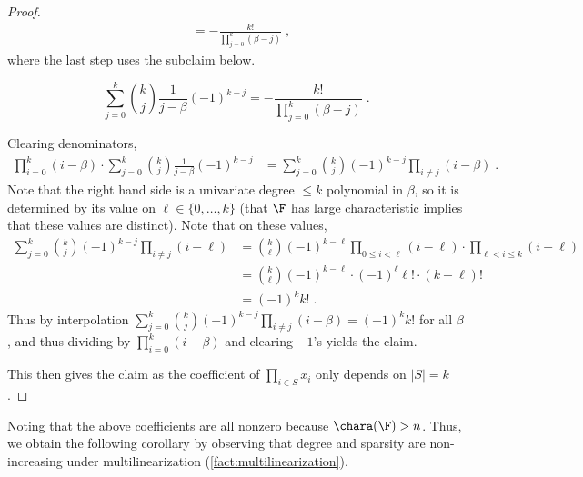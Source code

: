 \documentclass[11pt]{article}
\numberwithin{equation}{section}
\theoremstyle{definition}
\theoremstyle{plain}
\begin{document}
\begin{proof}
\begin{align*}
                &=-\frac{k!}{\prod_{j=0}^k (\beta-j)}
                \;,
        \end{align*}
        where the last step uses the %
            subclaim below.   %
        \begin{subclaim}
                \[
                        \sum_{j=0}^k \binom{k}{j} \frac{1}{j-\beta} (-1)^{k-j}
                        =-\frac{k!}{\prod_{j=0}^k (\beta-j)}
                        \;.
                \]
        \end{subclaim}
        \begin{subproof}
                Clearing denominators,
                \begin{align*}
                        \prod_{i=0}^k (i-\beta)\cdot \sum_{j=0}^k \binom{k}{j} \frac{1}{j-\beta} (-1)^{k-j}
                        &=\sum_{j=0}^k \binom{k}{j}(-1)^{k-j} \prod_{i\ne j} (i-\beta)
                        \;.
                \end{align*}
                Note that the right hand side is a univariate degree $\le k$ polynomial in $\beta$, so it is determined by its value on $\ell\in\{0,\ldots,k\}$ (that $\F$ has large characteristic implies that these values are distinct). Note that on these values,
                \begin{align*}
                        \sum_{j=0}^k \binom{k}{j}(-1)^{k-j} \prod_{i\ne j} (i-\ell)
                        &=\binom{k}{\ell}(-1)^{k-\ell} \prod_{0\le i<\ell} (i-\ell) \cdot  \prod_{\ell<i\le k} (i-\ell)\\
                        &=\binom{k}{\ell}(-1)^{k-\ell} \cdot (-1)^{\ell} \ell! \cdot  (k-\ell)!\\
                        &=(-1)^k k!
                        \;.
                \end{align*}
                Thus by interpolation $\sum_{j=0}^k \binom{k}{j}(-1)^{k-j} \prod_{i\ne j} (i-\beta)=(-1)^k k!$ for all $\beta$, and thus dividing by $\prod_{i=0}^k (i-\beta)$ and clearing $-1$'s yields the claim.
        \end{subproof}
        This then gives the claim as the coefficient of $\prod_{i\in S}x_i$ only depends on $|S|=k$.
\end{proof}

Noting that the above coefficients are all nonzero because $\chara(\F)>n$.  Thus, we obtain the following corollary by observing that degree and sparsity are non-increasing under multilinearization (\autoref{fact:multilinearization}).
\end{document}
